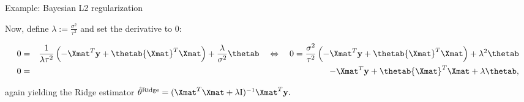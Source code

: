 \begin{vbframe}{Example: Bayesian L2 regularization}
\begin{scriptsize}
\end{scriptsize}

Now, define $\lambda := \frac{\sigma^2}{\tau^2}$ and set the derivative to 0:

\begin{scriptsize}
\begin{eqnarray*}
0 &=& \frac{1}{\lambda \tau^2} \left( - {\Xmat}^T \ydat + \thetab {\Xmat}^T \Xmat
\right) + \frac{\lambda}{\sigma^2} \thetab
\quad \Leftrightarrow \quad 0 = \frac{\sigma^2}{\tau^2} \left( - {\Xmat}^T \ydat 
+ \thetab {\Xmat}^T \Xmat \right) + \lambda^2 \thetab \\
0 &=&  - {\Xmat}^T \ydat + \thetab {\Xmat}^T \Xmat + \lambda \thetab 
,
\end{eqnarray*}
\end{scriptsize}

again yielding the Ridge estimator 
$\thetah^{\text{Ridge}} = (\Xmat^T \Xmat  + \lambda \id)^{-1} \Xmat^T\ydat.$

\end{vbframe}






